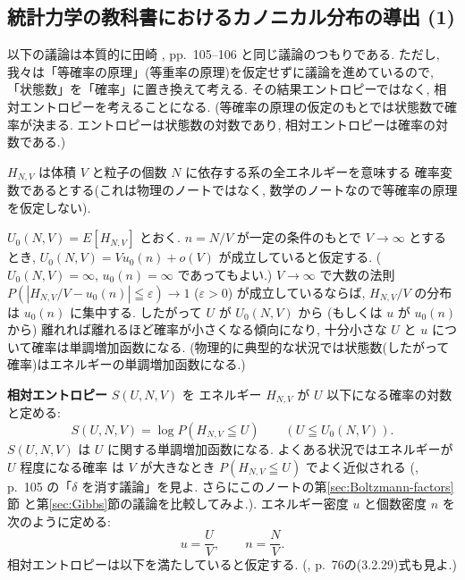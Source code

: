 \documentclass[12pt,twoside]{jarticle}
\newcommand\eps{\varepsilon}
\theoremstyle{jplain}
\theoremstyle{jplain}
\theoremstyle{jplain}
\numberwithin{theorem}{section}
\numberwithin{equation}{section}
\numberwithin{figure}{section}
\numberwithin{table}{section}
\newcommand\secref[1]{第\ref{#1}節}
\begin{document}
\subsection{統計力学の教科書におけるカノニカル分布の導出 (1)}
\label{sec:canonical-distribution-in-physics}

以下の議論は本質的に田崎 \cite{Tasaki}, pp.~105--106 と同じ議論のつもりである.
ただし, 我々は「等確率の原理」(等重率の原理)を仮定せずに議論を進めているので, 
「状態数」を「確率」に置き換えて考える. 
その結果エントロピーではなく, 相対エントロピーを考えることになる.
(等確率の原理の仮定のもとでは状態数で確率が決まる.
エントロピーは状態数の対数であり, 相対エントロピーは確率の対数である.)

$H_{N,V}$ は体積 $V$ と粒子の個数 $N$ に依存する系の全エネルギーを意味する
確率変数であるとする(これは物理のノートではなく, 
数学のノートなので等確率の原理を仮定しない).

$U_0(N,V)=E[H_{N,V}]$ とおく.
$n=N/V$ が一定の条件のもとで $V\to\infty$ とするとき, 
$U_0(N,V)=V u_0(n)+o(V)$ が成立していると仮定する.
($U_0(N,V)=\infty$, $u_0(n)=\infty$ であってもよい.)
$V\to\infty$ で大数の法則 $P(|H_{N,V}/V-u_0(n)|\leqq\eps)\to 1$ ($\eps>0$)
が成立しているならば, $H_{N,V}/V$ の分布は $u_0(n)$ に集中する.
したがって $U$ が $U_0(N,V)$ から
(もしくは $u$ が $u_0(n)$ から)
離れれば離れるほど確率が小さくなる傾向になり, 
十分小さな $U$ と $u$ について確率は単調増加函数になる.
(物理的に典型的な状況では状態数(したがって確率)はエネルギーの単調増加函数になる.)

{\bf 相対エントロピー} $S(U,N,V)$ を
エネルギー $H_{N,V}$ が $U$ 以下になる確率の対数と定める:
\[
S(U,N,V) = \log P(H_{N,V}\leqq U)
\qquad (U\leqq U_0(N,V)).
\]
$S(U,N,V)$ は $U$ に関する単調増加函数になる.
よくある状況ではエネルギーが $U$ 程度になる確率
は $V$ が大きなとき $P(H_{N,V}\leqq U)$ でよく近似される
(\cite{Tasaki}, p.~105 の「$\delta$ を消す議論」を見よ.
さらにこのノートの\secref{sec:Boltzmann-factors}
と\secref{sec:Gibbs}の議論を比較してみよ.).
エネルギー密度 $u$ と個数密度 $n$ を次のように定める:
\[
u=\frac{U}{V}, \qquad n=\frac{N}{V}.
\]
相対エントロピーは以下を満たしていると仮定する.
(\cite{Tasaki}, p.~76の(3.2.29)式も見よ.)
\end{document}
